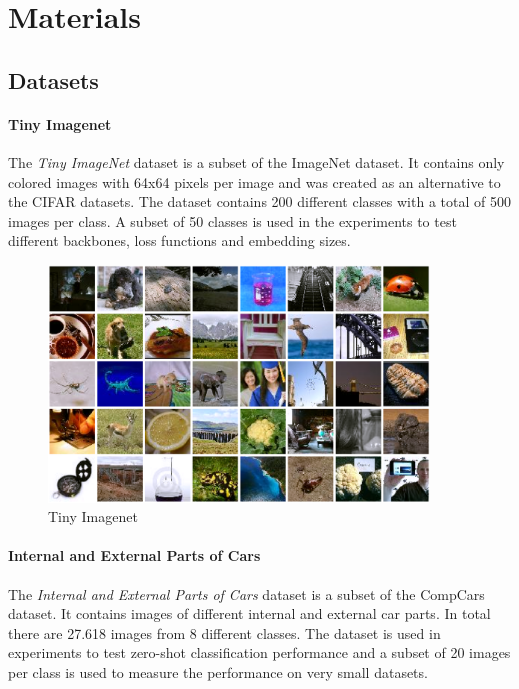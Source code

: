 \documentclass[12pt,a4paper]{report}
\begin{document}
\newpage
\chapter{Materials}

\section{Datasets}

\subsubsection{Tiny Imagenet}
The  \textit{Tiny ImageNet} dataset is a subset of the ImageNet dataset.
It contains only colored images with 64x64 pixels per image and was created as an alternative to the CIFAR \cite{cifar} datasets.
The dataset contains 200 different classes with a total of 500 images per class.\cite{tinyimagenet}
A subset of 50 classes is used in the experiments to test different backbones, loss functions and embedding sizes.

\begin{figure}[h]
    \centering
    \includegraphics[width=0.9\textwidth]{./images/tinyimagenet.png}
	\caption{Tiny Imagenet}
\end{figure}

\newpage

\subsubsection{Internal and External Parts of Cars}
The \textit{Internal and External Parts of Cars} dataset \cite{internalexternal} is a subset of the CompCars \cite{carparts} dataset.
It contains images of different internal and external car parts.
In total there are 27.618 images from 8 different classes.
The dataset is used in experiments to test zero-shot classification performance and a subset of 20 images per class is used to measure the performance on very small datasets.
\end{document}
